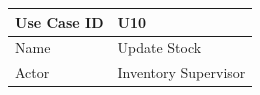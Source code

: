 \documentclass[12pt]{article}
\begin{document}
\begin{table}[H]
\begin{tabular}{|l|l|}
\hline
Use Case ID & U10                                                                                                                                                                                                                                                                                                                                                                                                                                                                                                                                                                                                                                                                                                                                                                                                                                                           \\ \hline
Name        & Update Stock                                                                                                                                                                                                                                                                                                                                                                                                                                                                                                                                                                                                                                                                                                                                                                                                                                                  \\ \hline
Actor       & Inventory Supervisor                                                                                                                                                                                                                                                                                                                                                                                                                                                                                                                                                                                                                                                                                                                                                                                                                                          \\ \hline

\end{tabular}
\end{table}
\end{document}
